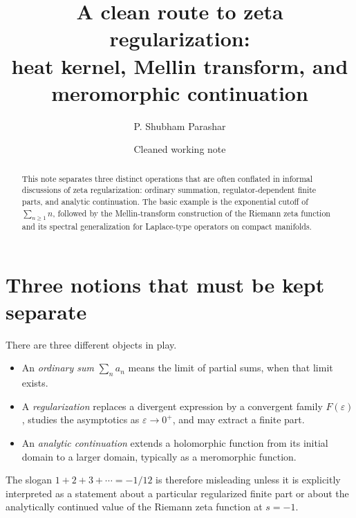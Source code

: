 \documentclass[11pt]{article}
\title{A clean route to zeta regularization:\\
\large heat kernel, Mellin transform, and meromorphic continuation}
\author{P. Shubham Parashar}
\date{Cleaned working note}
\begin{document}
\maketitle

\begin{abstract}
This note separates three distinct operations that are often conflated in informal discussions of zeta regularization: ordinary summation, regulator-dependent finite parts, and analytic continuation. The basic example is the exponential cutoff of $\sum_{n\ge 1} n$, followed by the Mellin-transform construction of the Riemann zeta function and its spectral generalization for Laplace-type operators on compact manifolds.
\end{abstract}

\section{Three notions that must be kept separate}
There are three different objects in play.
\begin{itemize}
  \item An \emph{ordinary sum} $\sum_n a_n$ means the limit of partial sums, when that limit exists.
  \item A \emph{regularization} replaces a divergent expression by a convergent family $F(\varepsilon)$, studies the asymptotics as $\varepsilon\to 0^+$, and may extract a finite part.
  \item An \emph{analytic continuation} extends a holomorphic function from its initial domain to a larger domain, typically as a meromorphic function.
\end{itemize}
The slogan $1+2+3+\cdots=-1/12$ is therefore misleading unless it is explicitly interpreted as a statement about a particular regularized finite part or about the analytically continued value of the Riemann zeta function at $s=-1$.
\end{document}
